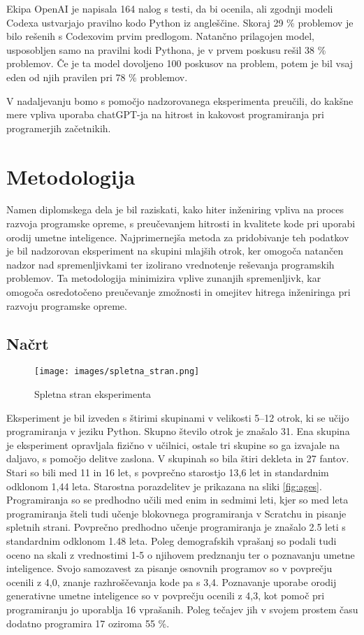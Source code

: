 \documentclass[a4paper,12pt,openright]{book}
\begin{document}
Ekipa OpenAI je napisala 164 nalog s testi, da bi ocenila, ali
zgodnji modeli Codexa ustvarjajo pravilno kodo Python iz angleščine. Skoraj 29 \% problemov je bilo rešenih s Codexovim prvim predlogom. 
Natančno prilagojen model, usposobljen samo na pravilni kodi Pythona,
je v prvem poskusu rešil 38 \% problemov. Če je ta model
dovoljeno 100 poskusov na problem, potem je bil vsaj eden od njih
pravilen pri 78 \% problemov.

\cite{DBLP:journals/corr/abs-2107-03374}

V nadaljevanju bomo s pomočjo nadzorovanega eksperimenta preučili, do kakšne mere vpliva uporaba chatGPT-ja na hitrost in kakovost programiranja pri programerjih začetnikih.


\chapter{Metodologija}

Namen diplomskega dela je bil raziskati, kako hiter inženiring vpliva na proces razvoja programske opreme, s preučevanjem hitrosti in kvalitete kode pri uporabi orodij umetne inteligence. Najprimernejša metoda za pridobivanje teh podatkov je bil nadzorovan eksperiment na skupini mlajših otrok, ker omogoča natančen nadzor nad spremenljivkami ter izolirano vrednotenje reševanja programskih problemov. Ta metodologija minimizira vplive zunanjih spremenljivk, kar omogoča osredotočeno preučevanje zmožnosti in omejitev hitrega inženiringa pri razvoju programske opreme.

\section{Načrt}

\begin{figure}[H]
    \centering
    \texttt{[image: images/spletna\_stran.png]}
    \caption{Spletna stran eksperimenta}
    \label{fig:enter-label}
\end{figure}

Eksperiment je bil izveden s štirimi skupinami v velikosti 5–12 otrok, ki se učijo programiranja v jeziku Python. Skupno število otrok je znašalo 31. Ena skupina je eksperiment opravljala fizično v učilnici, ostale tri skupine so ga izvajale na daljavo, s pomočjo delitve zaslona. V skupinah so bila štiri dekleta in 27 fantov. Stari so bili med 11 in 16 let, s povprečno starostjo 13,6 let in standardnim odklonom 1,44 leta. Starostna porazdelitev je prikazana na sliki \ref{fig:ages}.  Programiranja so se predhodno učili med enim in sedmimi leti, kjer so med leta programiranja šteli tudi učenje blokovnega programiranja v Scratchu in pisanje spletnih strani. Povprečno predhodno učenje programiranja je znašalo 2.5 leti s standardnim odklonom 1.48 leta.
Poleg demografskih vprašanj so podali tudi oceno na skali z vrednostimi 1-5 o njihovem predznanju ter o poznavanju umetne inteligence. Svojo samozavest za pisanje osnovnih programov so v povprečju ocenili z 4,0, znanje razhroščevanja kode pa s 3,4. Poznavanje uporabe orodij generativne umetne inteligence so v povprečju ocenili z 4,3, kot pomoč pri programiranju jo uporablja 16 vprašanih.
Poleg tečajev jih v svojem prostem času dodatno programira 17 oziroma 55 \%.
\end{document}
